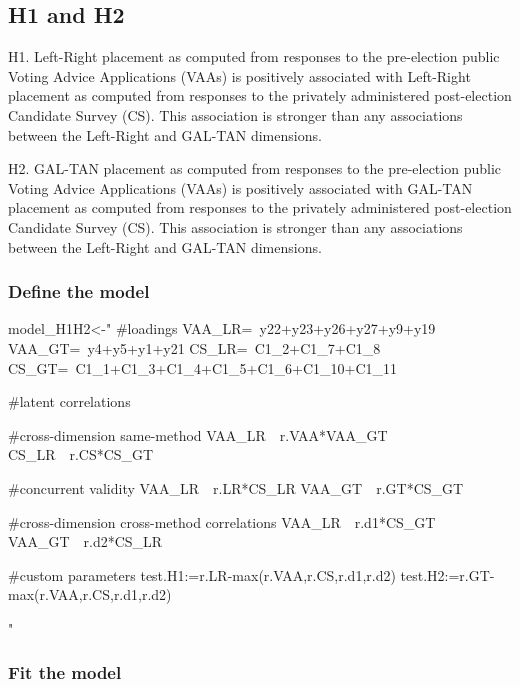 \documentclass[
]{article}
\newenvironment{Shaded}{\begin{snugshade}}{\end{snugshade}}
\newcommand{\NormalTok}[1]{#1}
\newcommand{\StringTok}[1]{\textcolor[rgb]{0.31,0.60,0.02}{#1}}
\begin{document}
\hypertarget{h1-and-h2}{%
\subsection{H1 and H2}\label{h1-and-h2}}

H1. Left-Right placement as computed from responses to the pre-election
public Voting Advice Applications (VAAs) is positively associated with
Left-Right placement as computed from responses to the privately
administered post-election Candidate Survey (CS). This association is
stronger than any associations between the Left-Right and GAL-TAN
dimensions.

H2. GAL-TAN placement as computed from responses to the pre-election
public Voting Advice Applications (VAAs) is positively associated with
GAL-TAN placement as computed from responses to the privately
administered post-election Candidate Survey (CS). This association is
stronger than any associations between the Left-Right and GAL-TAN
dimensions.

\hypertarget{define-the-model}{%
\subsubsection{Define the model}\label{define-the-model}}

\begin{Shaded}
\begin{Highlighting}[]
\NormalTok{model_H1H2<-}\StringTok{"}
\StringTok{#loadings}
\StringTok{VAA_LR=~y22+y23+y26+y27+y9+y19}
\StringTok{VAA_GT=~y4+y5+y1+y21}
\StringTok{CS_LR=~C1_2+C1_7+C1_8}
\StringTok{CS_GT=~C1_1+C1_3+C1_4+C1_5+C1_6+C1_10+C1_11}

\StringTok{#latent correlations}

\StringTok{#cross-dimension same-method}
\StringTok{VAA_LR~~r.VAA*VAA_GT}
\StringTok{CS_LR~~r.CS*CS_GT}

\StringTok{#concurrent validity}
\StringTok{VAA_LR~~r.LR*CS_LR}
\StringTok{VAA_GT~~r.GT*CS_GT}

\StringTok{#cross-dimension cross-method correlations}
\StringTok{VAA_LR~~r.d1*CS_GT}
\StringTok{VAA_GT~~r.d2*CS_LR}

\StringTok{#custom parameters}
\StringTok{test.H1:=r.LR-max(r.VAA,r.CS,r.d1,r.d2)}
\StringTok{test.H2:=r.GT-max(r.VAA,r.CS,r.d1,r.d2)}

\StringTok{"}
\end{Highlighting}
\end{Shaded}

\hypertarget{fit-the-model}{%
\subsubsection{Fit the model}\label{fit-the-model}}
\end{document}
